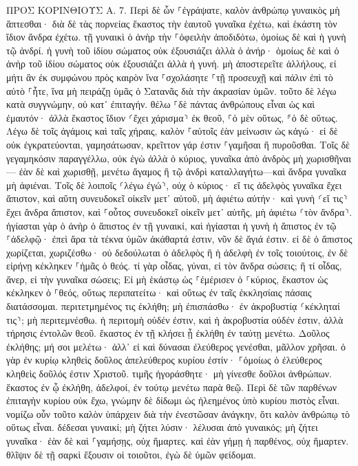 \documentclass[twoside, 9pt]{extreport}
\begin{document}
ΠΡΟΣ ΚΟΡΙΝΘΙΟΥΣ Α.
7.
Περὶ δὲ ὧν ⸀ἐγράψατε, καλὸν ἀνθρώπῳ γυναικὸς μὴ ἅπτεσθαι· 
διὰ δὲ τὰς πορνείας ἕκαστος τὴν ἑαυτοῦ γυναῖκα ἐχέτω, καὶ ἑκάστη τὸν ἴδιον ἄνδρα ἐχέτω. 
τῇ γυναικὶ ὁ ἀνὴρ τὴν ⸀ὀφειλὴν ἀποδιδότω, ὁμοίως δὲ καὶ ἡ γυνὴ τῷ ἀνδρί. 
ἡ γυνὴ τοῦ ἰδίου σώματος οὐκ ἐξουσιάζει ἀλλὰ ὁ ἀνήρ· ὁμοίως δὲ καὶ ὁ ἀνὴρ τοῦ ἰδίου σώματος οὐκ ἐξουσιάζει ἀλλὰ ἡ γυνή. 
μὴ ἀποστερεῖτε ἀλλήλους, εἰ μήτι ἂν ἐκ συμφώνου πρὸς καιρὸν ἵνα ⸀σχολάσητε ⸀τῇ προσευχῇ καὶ πάλιν ἐπὶ τὸ αὐτὸ ⸀ἦτε, ἵνα μὴ πειράζῃ ὑμᾶς ὁ Σατανᾶς διὰ τὴν ἀκρασίαν ὑμῶν. 
τοῦτο δὲ λέγω κατὰ συγγνώμην, οὐ κατ᾽ ἐπιταγήν. 
θέλω ⸀δὲ πάντας ἀνθρώπους εἶναι ὡς καὶ ἐμαυτόν· ἀλλὰ ἕκαστος ἴδιον ⸂ἔχει χάρισμα⸃ ἐκ θεοῦ, ⸀ὁ μὲν οὕτως, ⸁ὁ δὲ οὕτως. 
Λέγω δὲ τοῖς ἀγάμοις καὶ ταῖς χήραις, καλὸν ⸀αὐτοῖς ἐὰν μείνωσιν ὡς κἀγώ· 
εἰ δὲ οὐκ ἐγκρατεύονται, γαμησάτωσαν, κρεῖττον γάρ ἐστιν ⸀γαμῆσαι ἢ πυροῦσθαι. 
Τοῖς δὲ γεγαμηκόσιν παραγγέλλω, οὐκ ἐγὼ ἀλλὰ ὁ κύριος, γυναῖκα ἀπὸ ἀνδρὸς μὴ χωρισθῆναι— 
ἐὰν δὲ καὶ χωρισθῇ, μενέτω ἄγαμος ἢ τῷ ἀνδρὶ καταλλαγήτω—καὶ ἄνδρα γυναῖκα μὴ ἀφιέναι. 
Τοῖς δὲ λοιποῖς ⸂λέγω ἐγώ⸃, οὐχ ὁ κύριος· εἴ τις ἀδελφὸς γυναῖκα ἔχει ἄπιστον, καὶ αὕτη συνευδοκεῖ οἰκεῖν μετ᾽ αὐτοῦ, μὴ ἀφιέτω αὐτήν· 
καὶ γυνὴ ⸂εἴ τις⸃ ἔχει ἄνδρα ἄπιστον, καὶ ⸀οὗτος συνευδοκεῖ οἰκεῖν μετ᾽ αὐτῆς, μὴ ἀφιέτω ⸂τὸν ἄνδρα⸃. 
ἡγίασται γὰρ ὁ ἀνὴρ ὁ ἄπιστος ἐν τῇ γυναικί, καὶ ἡγίασται ἡ γυνὴ ἡ ἄπιστος ἐν τῷ ⸀ἀδελφῷ· ἐπεὶ ἄρα τὰ τέκνα ὑμῶν ἀκάθαρτά ἐστιν, νῦν δὲ ἅγιά ἐστιν. 
εἰ δὲ ὁ ἄπιστος χωρίζεται, χωριζέσθω· οὐ δεδούλωται ὁ ἀδελφὸς ἢ ἡ ἀδελφὴ ἐν τοῖς τοιούτοις, ἐν δὲ εἰρήνῃ κέκληκεν ⸀ἡμᾶς ὁ θεός. 
τί γὰρ οἶδας, γύναι, εἰ τὸν ἄνδρα σώσεις; ἢ τί οἶδας, ἄνερ, εἰ τὴν γυναῖκα σώσεις; 
Εἰ μὴ ἑκάστῳ ὡς ⸀ἐμέρισεν ὁ ⸀κύριος, ἕκαστον ὡς κέκληκεν ὁ ⸀θεός, οὕτως περιπατείτω· καὶ οὕτως ἐν ταῖς ἐκκλησίαις πάσαις διατάσσομαι. 
περιτετμημένος τις ἐκλήθη; μὴ ἐπισπάσθω· ἐν ἀκροβυστίᾳ ⸂κέκληταί τις⸃; μὴ περιτεμνέσθω. 
ἡ περιτομὴ οὐδέν ἐστιν, καὶ ἡ ἀκροβυστία οὐδέν ἐστιν, ἀλλὰ τήρησις ἐντολῶν θεοῦ. 
ἕκαστος ἐν τῇ κλήσει ᾗ ἐκλήθη ἐν ταύτῃ μενέτω. 
Δοῦλος ἐκλήθης; μή σοι μελέτω· ἀλλ᾽ εἰ καὶ δύνασαι ἐλεύθερος γενέσθαι, μᾶλλον χρῆσαι. 
ὁ γὰρ ἐν κυρίῳ κληθεὶς δοῦλος ἀπελεύθερος κυρίου ἐστίν· ⸀ὁμοίως ὁ ἐλεύθερος κληθεὶς δοῦλός ἐστιν Χριστοῦ. 
τιμῆς ἠγοράσθητε· μὴ γίνεσθε δοῦλοι ἀνθρώπων. 
ἕκαστος ἐν ᾧ ἐκλήθη, ἀδελφοί, ἐν τούτῳ μενέτω παρὰ θεῷ. 
Περὶ δὲ τῶν παρθένων ἐπιταγὴν κυρίου οὐκ ἔχω, γνώμην δὲ δίδωμι ὡς ἠλεημένος ὑπὸ κυρίου πιστὸς εἶναι. 
νομίζω οὖν τοῦτο καλὸν ὑπάρχειν διὰ τὴν ἐνεστῶσαν ἀνάγκην, ὅτι καλὸν ἀνθρώπῳ τὸ οὕτως εἶναι. 
δέδεσαι γυναικί; μὴ ζήτει λύσιν· λέλυσαι ἀπὸ γυναικός; μὴ ζήτει γυναῖκα· 
ἐὰν δὲ καὶ ⸀γαμήσῃς, οὐχ ἥμαρτες. καὶ ἐὰν γήμῃ ἡ παρθένος, οὐχ ἥμαρτεν. θλῖψιν δὲ τῇ σαρκὶ ἕξουσιν οἱ τοιοῦτοι, ἐγὼ δὲ ὑμῶν φείδομαι. 
\end{document}
